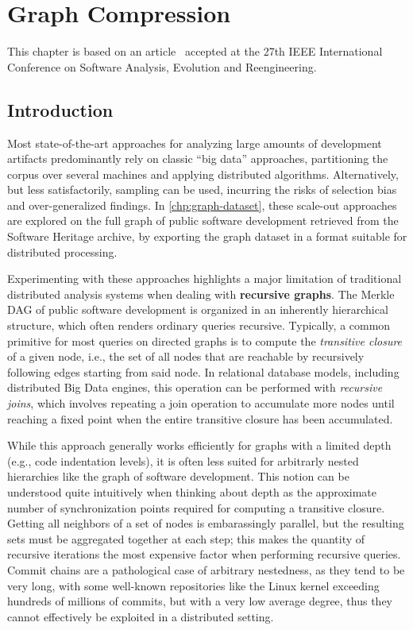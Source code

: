 \chapter{Graph Compression}%
\label{chp:graph-compression}

This chapter is based on an article~\cite{saner-2020-swh-graph} accepted at the
27th IEEE International Conference on Software Analysis, Evolution and
Reengineering.

\section{Introduction}%
\label{sec:compression-intro}

Most state-of-the-art approaches for analyzing large amounts of development
artifacts predominantly rely on classic ``big data'' approaches, partitioning the
corpus over several machines and applying distributed algorithms.
Alternatively, but less satisfactorily, sampling can be used, incurring the
risks of selection bias and over-generalized findings.
In \cref{chp:graph-dataset}, these scale-out approaches are explored on
the full graph of public software development retrieved from the Software
Heritage archive, by exporting the graph dataset in a format suitable for
distributed processing.

Experimenting with these approaches highlights a major limitation of
traditional distributed analysis systems when dealing with \textbf{recursive
graphs}. The Merkle \gls{DAG} of public software development is organized in an
inherently hierarchical structure, which often renders ordinary queries
recursive.
Typically, a common primitive for most queries on directed graphs is to
compute the \emph{transitive closure} of a given node, i.e., the set of all
nodes that are reachable by recursively following edges starting from said
node. In relational database models, including distributed Big Data engines,
this operation can be performed with \emph{recursive joins}, which involves
repeating a join operation to accumulate more nodes until reaching a fixed
point when the entire transitive closure has been accumulated.

While this approach generally works efficiently for graphs with a limited depth
(e.g., code indentation levels), it is often less suited for arbitrarly nested
hierarchies like the graph of software development.
This notion can be understood quite intuitively when thinking about depth as
the approximate number of synchronization points required for computing a
transitive closure. Getting all neighbors of a set of nodes is
embarassingly parallel, but the resulting sets must be aggregated together at
each step; this makes the quantity of recursive iterations the most expensive
factor when performing recursive queries.
Commit chains are a pathological case of arbitrary nestedness, as they tend to
be very long, with some well-known repositories like the Linux kernel exceeding
hundreds of millions of commits, but with a very low average degree, thus they
cannot effectively be exploited in a distributed setting.

